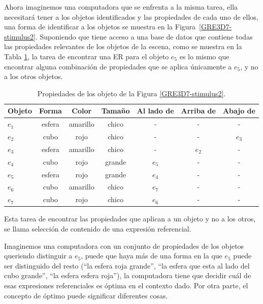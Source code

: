 Ahora imaginemos una computadora que se enfrenta a la misma
tarea, ella necesitar\'a tener a los objetos identificados y las propiedades de cada uno de ellos, una forma de identificar a los objetos se muestra en la Figura~\ref{GRE3D7-stimulus2}. Suponiendo que tiene acceso a una base de datos que contiene todas
las propiedades relevantes de los objetos de la escena, como se muestra en la Tabla \ref{tabla-propiedades}, la tarea de encontrar una ER para el objeto $e_5$ es lo mismo que encontrar alguna combinaci\'on de propiedades que se aplica \'unicamente a $e_5$, y no a los otros objetos.\\


\begin{table}[h!]
\begin{center}
\begin{tabular}{|l|c|c|c|c|c|c|}
\hline
Objeto& 	Forma		&	Color	&	Tama\~no & Al lado de & Arriba de	& Abajo de	\\
\hline
$e_1$ & esfera & amarillo & chico & - & - & -\\
$e_2$ & cubo & rojo & chico & - & - & $e_3$\\
$e_3$ & esfera & amarillo & chico & - & $e_2$ & -\\
$e_4$ & cubo & rojo & grande & $e_5$ & - & -\\
$e_5$ & esfera & rojo & grande & $e_4$ & - & -\\
$e_6$ & cubo & amarillo & chico & $e_7$ & - & -\\
$e_7$ & cubo & rojo & chico & $e_6$ & - & -\\

\hline
\end{tabular}
\caption{Propiedades de los objeto de la Figura \ref{GRE3D7-stimulus2}.}
\vspace*{-.5cm}
\label{tabla-propiedades}
\end{center}
\end{table}


Esta tarea de encontrar las propiedades que aplican a un objeto y no a los otros, se llama selecci\'on de contenido de una expresi\'on referencial.  

Imaginemos una computadora con un conjunto de propiedades de los objetos queriendo distinguir a $e_5$, puede que haya m\'as de una forma en la que $e_5$ puede ser distinguido del resto (``la esfera roja grande'', ``la esfera que esta al lado del cubo grande'', ``la esfera esfera roja''), la computadora tiene que decidir cu\'al de esas expresiones referenciales es \'optima en el contexto dado. Por otra parte, el concepto de \'optimo puede significar diferentes cosas.

